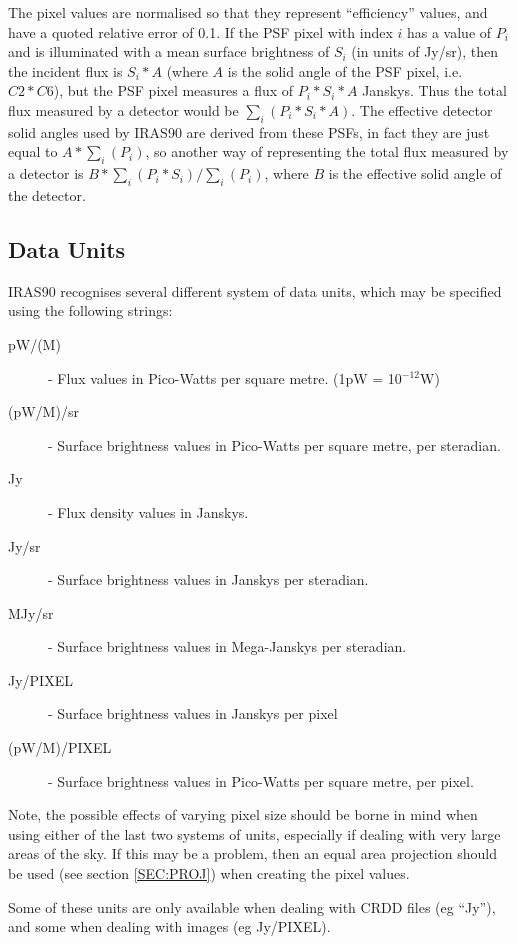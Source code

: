 The pixel values are normalised so that they represent ``efficiency''
values, and have a quoted relative error of 0.1. If the {\small PSF} pixel with
index $i$ has a value of $P_{i}$ and is illuminated with a mean surface
brightness of $S_{i}$ (in units of Jy/sr), then the incident flux is
$S_{i}*A$  (where $A$ is the solid angle of the {\small PSF} pixel,
i.e. $C2*C6$), but the {\small PSF} pixel measures a flux of
$P_{i}*S_{i}*A$ Janskys. Thus the total flux measured by a detector
would be $\sum_{i}( P_{i}*S_{i}*A)$. The effective detector solid
angles used by {\small IRAS90} are derived from these {\small PSF}s, in
fact they are just equal to $A*\sum_{i}(P_{i})$, so another way of
representing the total flux measured by a detector is $B*\sum_{i}(
P_{i}*S_{i} )/\sum_{i}( P_{i} )$, where $B$ is the effective solid
angle of the detector.

\subsection{Data Units}
\label{SEC:UNITS}
{\small IRAS90} recognises several different system of data units, which
may be specified using the following strings:

\begin{description}
\item [pW/(M\lsk{})] - Flux values in Pico-Watts per square metre.
                          (1pW = 10$^{-12}$W)
\item [(pW/M\lsk{})/sr] - Surface brightness values in Pico-Watts per
square metre, per steradian.
\item [Jy] - Flux density values in Janskys.
\item [Jy/sr] - Surface brightness values in Janskys per steradian.
\item [MJy/sr] - Surface brightness values in Mega-Janskys per steradian.
\item [Jy/PIXEL] - Surface brightness values in Janskys per pixel
\item [(pW/M\lsk{})/PIXEL] - Surface brightness values in Pico-Watts per
square metre, per pixel.
\end{description}
Note, the possible effects of varying pixel size should be borne
in mind when using either of the last two systems of units,
especially if dealing with very large areas of the sky. If this
may be a problem, then an equal area projection should be used
(see section \ref{SEC:PROJ}) when creating the pixel
values.

Some of these units are only available when dealing with {\small CRDD}
files (eg ``Jy''), and some when dealing with images (eg Jy/PIXEL).

